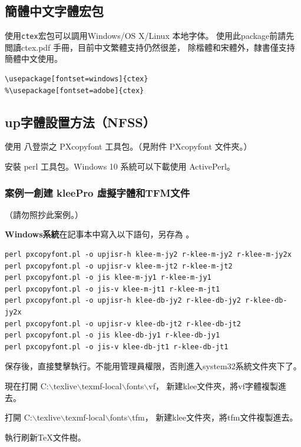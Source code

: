 \subsection{簡體中文字體宏包}
\par
使用\verb+ctex+宏包可以調用Windows/OS X/Linux 本地字体。
使用此package前請先閲讀ctex.pdf 手冊，目前中文繁體支持仍然很差，
除楷體和宋體外，隸書僅支持簡體中文使用。
\begin{lstlisting}[firstnumber=1]
\usepackage[fontset=windows]{ctex}
%\usepackage[fontset=adobe]{ctex}
\end{lstlisting}

\subsection{{up\LaTeXe}字體設置方法（NFSS）}

\par{}使用 八登崇之 PXcopyfont 工具包。（見附件 PXcopyfont 文件夾。）
\par{}安裝 perl 工具包。Windows 10 系統可以下載使用 {ActivePerl}。

\subsubsection*{案例一創建 {kleePro} 虛擬字體和TFM文件}

（請勿照抄此案例。）

\par{}{\bfseries{Windows系統}}在記事本中寫入以下語句，另存為 。
\begin{lstlisting}[firstnumber=1]
perl pxcopyfont.pl -o upjisr-h klee-m-jy2 r-klee-m-jy2 r-klee-m-jy2x
perl pxcopyfont.pl -o upjisr-v klee-m-jt2 r-klee-m-jt2
perl pxcopyfont.pl -o jis klee-m-jy1 r-klee-m-jy1
perl pxcopyfont.pl -o jis-v klee-m-jt1 r-klee-m-jt1
perl pxcopyfont.pl -o upjisr-h klee-db-jy2 r-klee-db-jy2 r-klee-db-jy2x
perl pxcopyfont.pl -o upjisr-v klee-db-jt2 r-klee-db-jt2
perl pxcopyfont.pl -o jis klee-db-jy1 r-klee-db-jy1
perl pxcopyfont.pl -o jis-v klee-db-jt1 r-klee-db-jt1
\end{lstlisting}

\par{}保存後，直接雙擊執行。不能用管理員權限，否則進入system32系統文件夾下了。
\par{}現在打開
{\color{red}C:$\backslash$texlive$\backslash$texmf-local$\backslash$fonts$\backslash$vf}，
新建klee文件夾，將vf字體複製進去。
\par{}打開
{\color{red}C:$\backslash$texlive$\backslash$texmf-local$\backslash$fonts$\backslash$tfm}，
新建klee文件夾，將tfm文件複製進去。
\par{}執行刷新{\TeX}文件樹。

